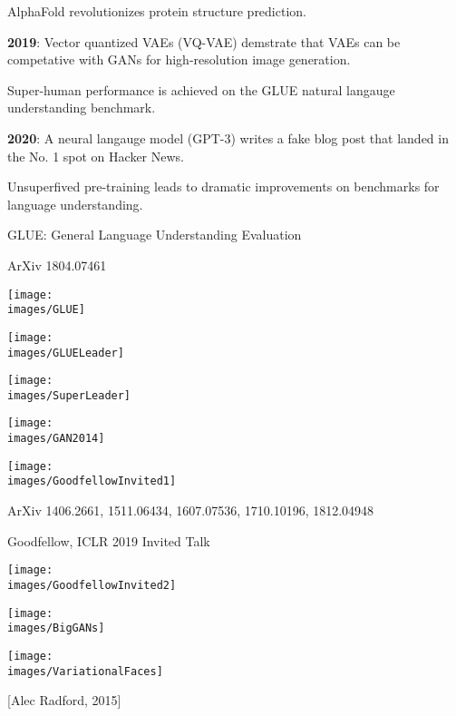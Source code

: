 {{\vfill
AlphaFold revolutionizes protein structure prediction.

\vfill{\bf 2019}:
{\color{red} Vector quantized VAEs (VQ-VAE)} demstrate that VAEs can be competative with GANs for high-resolution image generation.

\vfill
Super-human performance is achieved on the GLUE natural langauge understanding benchmark.


\vfill{\bf 2020}:
A neural langauge model (GPT-3) writes a fake blog post that landed in the No. 1 spot on Hacker News.


Unsuperfived pre-training leads to dramatic improvements on benchmarks for language understanding.

\vfill
GLUE: General Language Understanding Evaluation

\vfill

\centerline{\normalsize ArXiv 1804.07461}
\centerline{\texttt{[image: \\images/GLUE]}}


\centerline{\texttt{[image: \\images/GLUELeader]}}


\centerline{\texttt{[image: \\images/SuperLeader]}}

\centerline{\texttt{[image: \\images/GAN2014]}}


\centerline{\texttt{[image: \\images/GoodfellowInvited1]}}

ArXiv 1406.2661, 1511.06434, 1607.07536, 1710.10196, 1812.04948

\centerline{Goodfellow, ICLR 2019 Invited Talk}


\centerline{\texttt{[image: \\images/GoodfellowInvited2]}}


\centerline{\texttt{[image: \\images/BigGANs]}}


\centerline{\texttt{[image: \\images/VariationalFaces]}}
\centerline{[Alec Radford, 2015]}

}}
